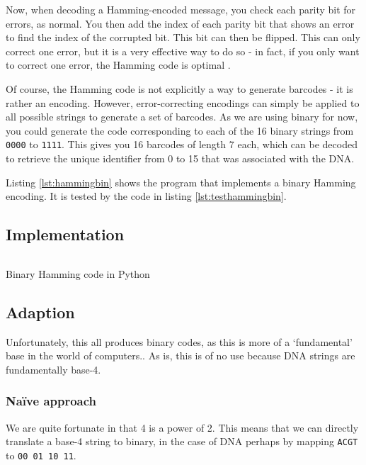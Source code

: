 \documentclass[a4paper,11pt]{article}
\newenvironment{longlisting}
{\addvspace{\baselineskip}\captionsetup{type=listing}}
{\addvspace{\baselineskip}}
\begin{document}
    Now, when decoding a Hamming-encoded message, you check each parity bit for
    errors, as normal. You then add the index of each parity bit that shows an
    error to find the index of the corrupted bit. This bit can then be flipped.
    This can only correct one error, but it is a very effective way to do so -
    in fact, if you only want to correct one error, the Hamming code is optimal
    \cite{Codes1950Hamming}.

    Of course, the Hamming code is not explicitly a way to generate barcodes -
    it is rather an encoding. However, error-correcting encodings can simply be
    applied to all possible strings to generate a set of barcodes. As we are
    using binary for now, you could generate the code corresponding to each of
    the 16 binary strings from \texttt{0000} to \texttt{1111}. This gives you 16
    barcodes of length 7 each, which can be decoded to retrieve the unique
    identifier from 0 to 15 that was associated with the DNA.

    Listing \ref{lst:hammingbin} shows the program that implements a binary
    Hamming encoding. It is tested by the code in listing
    \ref{lst:testhammingbin}.

    \subsection{Implementation}

\begin{longlisting}
\inputminted{python}{../src/encode_hamming.py}
\caption{Binary Hamming code in Python}\label{lst:hammingbin}
\end{longlisting}

    \subsection{Adaption}

    Unfortunately, this all produces binary codes, as this is more of a
    `fundamental' base in the world of computers.. As is, this is of no use
    because DNA strings are fundamentally base-4.

    \subsubsection{Na\"ive approach}

    We are quite fortunate in that 4 is a power of 2. This means that
    we can directly translate a base-4 string to binary, in the case of DNA
    perhaps by mapping \texttt{ACGT} to \texttt{00 01 10 11}.
\end{document}
